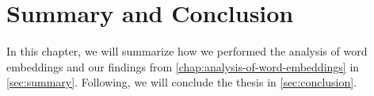 \chapter{Summary and Conclusion}
\label{chap:summary-and-conclusion}
In this chapter, we will summarize how we performed the analysis of word embeddings and our findings from \cref{chap:analysis-of-word-embeddings} in \cref{sec:summary}. Following, we will conclude the thesis in \cref{sec:conclusion}.


